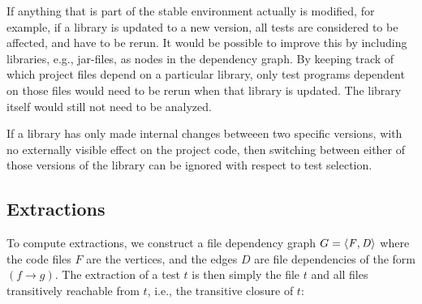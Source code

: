 {%

If anything that is part of the stable environment actually is modified, for example, if a library is updated to a new version, all tests are considered to be affected, and have to be rerun. It would be possible to improve this by including libraries, e.g., jar-files, as nodes in the dependency graph. By keeping track of which project files depend on a particular library, only test programs dependent on those files would need to be rerun when that library is updated. The library itself would still not need to be analyzed. 

If a library has only made internal changes betweeen two specific versions, with no externally
visible effect on the project code, then switching between either of those versions of the library
can be ignored with respect to test selection.



\subsection{Extractions}




To compute extractions, we construct a file dependency graph $G = \left \langle \mathit{ F,D }\right \rangle $ where the code files $F$ are the vertices, and the edges $D$ are file dependencies of the form $(f \rightarrow g)$. The extraction of a test $t$ is then simply the file $t$ and all files transitively reachable from $t$, i.e., the transitive closure of $t$:

}
